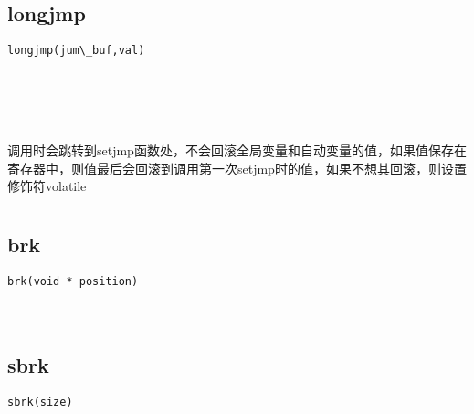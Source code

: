 \documentclass[10pt,a4paper]{article}
\begin{document}
\subsection{longjmp}
\begin{spacing}{2.0}
\lstset{language=C,numbers=none}
\begin{lstlisting}
longjmp(jum\_buf,val)
\end{lstlisting}
{\large\color[rgb]{0.2,0.4,0.6}{jum\_buf:}} \\
{\large\color[rgb]{0.2,0.4,0.6}{val:}}
\paragraph{ \ \ }调用时会跳转到setjmp函数处，不会回滚全局变量和自动变量的值，如果值保存在寄存器中，则值最后会回滚到调用第一次setjmp时的值，如果不想其回滚，则设置修饰符volatile
\end{spacing}

\section{\color[rgb]{0.2,0.4,0.6}{堆操作}}
\subsection{brk}
\begin{spacing}{2.0}
\lstset{language=C,numbers=none}
\begin{lstlisting}
brk(void * position)
\end{lstlisting}
{\large\color[rgb]{0.2,0.4,0.6}{position:}}
\paragraph{ \ \ }
\end{spacing}

\subsection{sbrk}
\begin{spacing}{2.0}
\lstset{language=C,numbers=none}
\begin{lstlisting}
sbrk(size)
\end{lstlisting}
{\large\color[rgb]{0.2,0.4,0.6}{size:}}
\paragraph{ \ \ }
\end{spacing}
\end{document}
